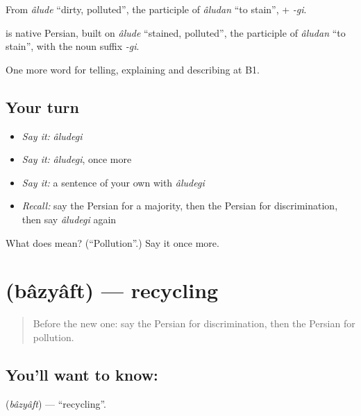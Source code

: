 From \emph{âlude} \textquotedblleft{}dirty, polluted\textquotedblright{}, the participle of \emph{âludan} \textquotedblleft{}to stain\textquotedblright{}, + \emph{-gi}.

\begin{cousinweb}
\textbf{} is native Persian, built on \emph{âlude} \textquotedblleft{}stained, polluted\textquotedblright{}, the participle of \emph{âludan} \textquotedblleft{}to stain\textquotedblright{}, with the noun suffix \emph{-gi}.
\end{cousinweb}

\begin{grammarlens}[title={What you've built}]
One more word for telling, explaining and describing at B1.
\end{grammarlens}

\subsection*{Your turn}
\begin{itemize}
\raggedright
  \item \emph{Say it:} \emph{âludegi}
  \item \emph{Say it:} \emph{âludegi}, once more
  \item \emph{Say it:} a sentence of your own with \emph{âludegi}
  \item \emph{Recall:} say the Persian for a majority, then the Persian for discrimination, then say \emph{âludegi} again
\end{itemize}

\begin{tcolorbox}[breakable,colback=teal!4,colframe=teal!35!black,title={Before you move on}]
What does  mean? (\textquotedblleft{}Pollution\textquotedblright{}.) Say it once more.
\end{tcolorbox}
\section[\texorpdfstring{\fa{بازیافت} (bâzyâft)}{بازیافت (bâzyâft)}]{ (bâzyâft) — recycling}

\label{lesson:FA-C388-bazyaft}



\begin{quote}
Before the new one: say the Persian for discrimination, then the Persian for pollution.
\end{quote}

\subsection*{You'll want to know: }
\textbf{} (\emph{bâzyâft}) — \textquotedblleft{}recycling\textquotedblright{}.

